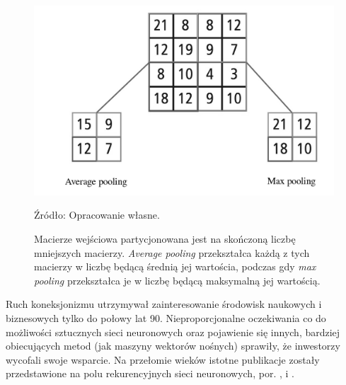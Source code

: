 \documentclass[12pt,a4paper,twoside]{article}
\newcommand{\source}[1]{\caption*{\hfill Źródło: {#1}} }
\begin{document}
\begin{figure}[h]
  \centering
\includegraphics[scale=0.3]{../obrazy/fig:pooling.png}
\caption{Macierze wejściowa partycjonowana jest na skończoną liczbę mniejszych macierzy. \textit{Average pooling} przekształca każdą z tych macierzy w liczbę będącą średnią jej wartościa, podczas gdy \textit{max pooling} przekształca je w liczbę będącą maksymalną jej wartością. \label{fig:pooling}}
\source{Opracowanie własne.}
\end{figure}

Ruch koneksjonizmu utrzymywał zainteresowanie środowisk naukowych i biznesowych tylko do połowy lat 90. Nieproporcjonalne oczekiwania co do możliwości sztucznych sieci neuronowych oraz pojawienie się innych, bardziej obiecujących metod (jak maszyny wektorów nośnych) sprawiły, że inwestorzy wycofali swoje wsparcie. Na przełomie wieków istotne publikacje zostały przedstawione na polu rekurencyjnych sieci neuronowych, por. \citet{schmidhuber1997}, \citet{schuster1997} i \citet{graves2005}.
\end{document}
